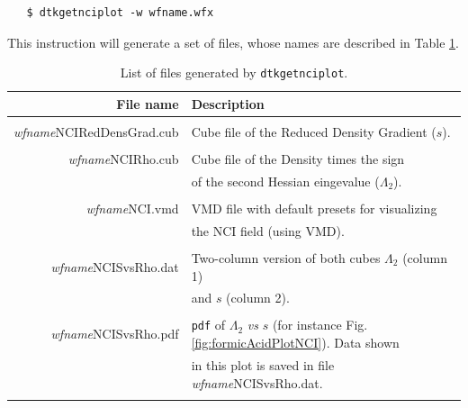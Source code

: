 \begin{lstlisting}
   $ dtkgetnciplot -w wfname.wfx
\end{lstlisting}

This instruction will generate a set of files, whose names are described in
Table \ref{tab:ncilistfiles}.
\begin{table}[hbt!]
\footnotesize
\centering
\begin{tabular}{r ||l}
\hline 
\textbf{File name}  & \textbf{Description}   \\ \hline
 & \\
{\it wfname}NCIRedDensGrad.cub& Cube file of the Reduced Density Gradient ($s$). \\
 & \\
{\it wfname}NCIRho.cub& Cube file of the Density times the sign \\ 
                                 & of the second Hessian eingevalue ($\Lambda_2$). \\
 & \\
{\it wfname}NCI.vmd& VMD file with default presets for visualizing\\
                   & the NCI field (using VMD). \\
 & \\
 {\it wfname}NCISvsRho.dat& Two-column version of both cubes $\Lambda_2$ (column 1)\\
                                    & and $s$ (column 2).\\
 & \\
 {\it wfname}NCISvsRho.pdf& \texttt{pdf} of $\Lambda_2$ \textit{vs} $s$ (for instance
 Fig. \ref{fig:formicAcidPlotNCI}). Data shown\\ 
  & in this plot is saved in file {\it wfname}NCISvsRho.dat.\\
 & \\\hline
\end{tabular}
\caption{List of files generated by \texttt{dtkgetnciplot}.\label{tab:ncilistfiles}}
\end{table}

